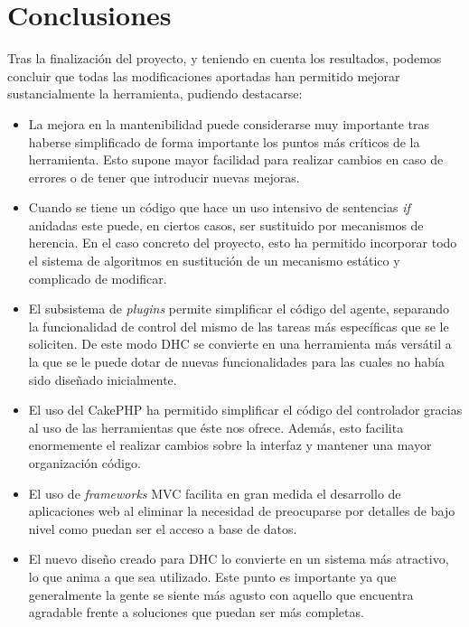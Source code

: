 \chapter{Conclusiones}

Tras la finalización del proyecto, y teniendo en cuenta los resultados, podemos concluir que todas las modificaciones aportadas han permitido mejorar sustancialmente la herramienta, pudiendo destacarse:

\begin{itemize}
	\item La mejora en la mantenibilidad puede considerarse muy importante tras haberse simplificado de forma importante los puntos más críticos de la herramienta. Esto supone mayor facilidad para realizar cambios en caso de errores o de tener que introducir nuevas mejoras.
	
	\item Cuando se tiene un código que hace un uso intensivo de sentencias \emph{if} anidadas este puede, en ciertos casos, ser sustituido por mecanismos de herencia. En el caso concreto del proyecto, esto ha permitido incorporar todo el sistema de algoritmos en sustitución de un mecanismo estático y complicado de modificar.
	
	\item El subsistema de \emph{plugins} permite simplificar el código del agente, separando la funcionalidad de control del mismo de las tareas más específicas que se le soliciten. De este modo DHC se convierte en una herramienta más versátil a la que se le puede dotar de nuevas funcionalidades para las cuales no había sido diseñado inicialmente.
	
	\item El uso del CakePHP ha permitido simplificar el código del controlador gracias al uso de las herramientas que éste nos ofrece. Además, esto facilita enormemente el realizar cambios sobre la interfaz y mantener una mayor organización código.
	
	\item El uso de \emph{frameworks} MVC facilita en gran medida el desarrollo de aplicaciones web al eliminar la necesidad de preocuparse por detalles de bajo nivel como puedan ser el acceso a base de datos.

	\item El nuevo diseño creado para DHC lo convierte en un sistema más atractivo, lo que anima a que sea utilizado. Este punto es importante ya que generalmente la gente se siente más agusto con aquello que encuentra agradable frente a soluciones que puedan ser más completas.
	

\end{itemize}

